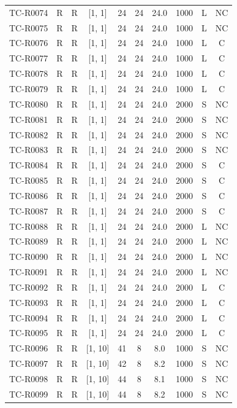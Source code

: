 \begin{longtable}{lccccccccc}
TC-R0074 & R & R & [1, 1] & 24 & 24 & 24.0 & 1000 & L & NC \\
TC-R0075 & R & R & [1, 1] & 24 & 24 & 24.0 & 1000 & L & NC \\
TC-R0076 & R & R & [1, 1] & 24 & 24 & 24.0 & 1000 & L & C \\
TC-R0077 & R & R & [1, 1] & 24 & 24 & 24.0 & 1000 & L & C \\
TC-R0078 & R & R & [1, 1] & 24 & 24 & 24.0 & 1000 & L & C \\
TC-R0079 & R & R & [1, 1] & 24 & 24 & 24.0 & 1000 & L & C \\
TC-R0080 & R & R & [1, 1] & 24 & 24 & 24.0 & 2000 & S & NC \\
TC-R0081 & R & R & [1, 1] & 24 & 24 & 24.0 & 2000 & S & NC \\
TC-R0082 & R & R & [1, 1] & 24 & 24 & 24.0 & 2000 & S & NC \\
TC-R0083 & R & R & [1, 1] & 24 & 24 & 24.0 & 2000 & S & NC \\
TC-R0084 & R & R & [1, 1] & 24 & 24 & 24.0 & 2000 & S & C \\
TC-R0085 & R & R & [1, 1] & 24 & 24 & 24.0 & 2000 & S & C \\
TC-R0086 & R & R & [1, 1] & 24 & 24 & 24.0 & 2000 & S & C \\
TC-R0087 & R & R & [1, 1] & 24 & 24 & 24.0 & 2000 & S & C \\
TC-R0088 & R & R & [1, 1] & 24 & 24 & 24.0 & 2000 & L & NC \\
TC-R0089 & R & R & [1, 1] & 24 & 24 & 24.0 & 2000 & L & NC \\
TC-R0090 & R & R & [1, 1] & 24 & 24 & 24.0 & 2000 & L & NC \\
TC-R0091 & R & R & [1, 1] & 24 & 24 & 24.0 & 2000 & L & NC \\
TC-R0092 & R & R & [1, 1] & 24 & 24 & 24.0 & 2000 & L & C \\
TC-R0093 & R & R & [1, 1] & 24 & 24 & 24.0 & 2000 & L & C \\
TC-R0094 & R & R & [1, 1] & 24 & 24 & 24.0 & 2000 & L & C \\
TC-R0095 & R & R & [1, 1] & 24 & 24 & 24.0 & 2000 & L & C \\
TC-R0096 & R & R & [1, 10] & 41 & 8 & 8.0 & 1000 & S & NC \\
TC-R0097 & R & R & [1, 10] & 42 & 8 & 8.2 & 1000 & S & NC \\
TC-R0098 & R & R & [1, 10] & 44 & 8 & 8.1 & 1000 & S & NC \\
TC-R0099 & R & R & [1, 10] & 44 & 8 & 8.2 & 1000 & S & NC \\

\end{longtable}
